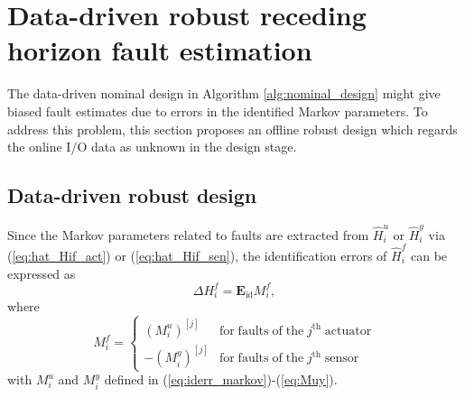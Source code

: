 \documentclass[twocolumn]{autart}
\begin{document}
\section{Data-driven robust receding horizon fault estimation}\label{sect:dd_robust}
The data-driven nominal design in Algorithm \ref{alg:nominal_design} might give biased fault estimates due to errors in the identified Markov parameters. To address this problem, this section proposes an offline robust design which regards the online I/O data as unknown in the design stage.


\subsection{Data-driven robust design}
Since the Markov parameters related to faults are extracted from $\hat H_i^u$ or $\hat H_i^y$ via (\ref{eq:hat_Hif_act}) or (\ref{eq:hat_Hif_sen}), the identification errors of $\hat H_i^f$ can be  expressed as
\begin{equation}\label{eq:delta_Hif}
\Delta H_i^f = \mathbf{E}_{\mathrm{id}} {M}_i^f,
\end{equation}
where
\begin{equation}\label{eq:Mif}
{M}_i^f = \left\{ \begin{array}{ll}
                    \left( {M}_i^u \right)^{[j]} & \mathrm{for\; faults\; of\; the} \; j^{\mathrm{th}} \;\mathrm{actuator} \\
                    -\left( {M}_i^y \right)^{[j]} & \mathrm{for\; faults\; of\; the} \; j^{\mathrm{th}} \;\mathrm{sensor}
                  \end{array}
 \right.
\end{equation}
with ${M}_i^u$ and ${M}_i^y$ defined in (\ref{eq:iderr_markov})-(\ref{eq:Muy}).
\end{document}
